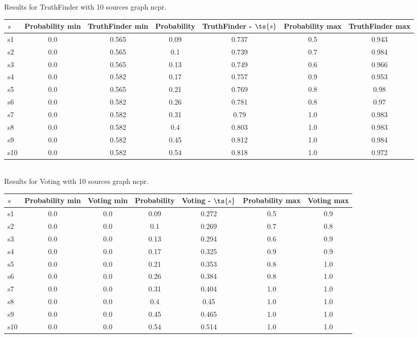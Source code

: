 \documentclass{article}
\begin{document}
\noindent Results for TruthFinder with 10 sources graph ncpr.

\noindent\begin{tabular}{|l|c|c|c|c|c|c|}
\hline
$s$& Probability min & TruthFinder min & Probability & TruthFinder - $\ts{s}$ & Probability max & TruthFinder max\\
\hline
s1 &0.0 & 0.565 & 0.09 & 0.737 & 0.5 & 0.943\\
\hline
s2 &0.0 & 0.565 & 0.1 & 0.739 & 0.7 & 0.984\\
\hline
s3 &0.0 & 0.565 & 0.13 & 0.749 & 0.6 & 0.966\\
\hline
s4 &0.0 & 0.582 & 0.17 & 0.757 & 0.9 & 0.953\\
\hline
s5 &0.0 & 0.565 & 0.21 & 0.769 & 0.8 & 0.98\\
\hline
s6 &0.0 & 0.582 & 0.26 & 0.781 & 0.8 & 0.97\\
\hline
s7 &0.0 & 0.582 & 0.31 & 0.79 & 1.0 & 0.983\\
\hline
s8 &0.0 & 0.582 & 0.4 & 0.803 & 1.0 & 0.983\\
\hline
s9 &0.0 & 0.582 & 0.45 & 0.812 & 1.0 & 0.984\\
\hline
s10 &0.0 & 0.582 & 0.54 & 0.818 & 1.0 & 0.972\\
\hline
\end{tabular}\\

\noindent Results for Voting with 10 sources graph ncpr.

\noindent\begin{tabular}{|l|c|c|c|c|c|c|}
\hline
$s$& Probability min & Voting min & Probability & Voting - $\ts{s}$ & Probability max & Voting max\\
\hline
s1 &0.0 & 0.0 & 0.09 & 0.272 & 0.5 & 0.9\\
\hline
s2 &0.0 & 0.0 & 0.1 & 0.269 & 0.7 & 0.8\\
\hline
s3 &0.0 & 0.0 & 0.13 & 0.294 & 0.6 & 0.9\\
\hline
s4 &0.0 & 0.0 & 0.17 & 0.325 & 0.9 & 0.9\\
\hline
s5 &0.0 & 0.0 & 0.21 & 0.353 & 0.8 & 1.0\\
\hline
s6 &0.0 & 0.0 & 0.26 & 0.384 & 0.8 & 1.0\\
\hline
s7 &0.0 & 0.0 & 0.31 & 0.404 & 1.0 & 1.0\\
\hline
s8 &0.0 & 0.0 & 0.4 & 0.45 & 1.0 & 1.0\\
\hline
s9 &0.0 & 0.0 & 0.45 & 0.465 & 1.0 & 1.0\\
\hline
s10 &0.0 & 0.0 & 0.54 & 0.514 & 1.0 & 1.0\\
\hline
\end{tabular}\\
\end{document}
